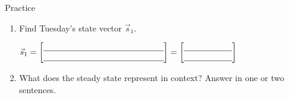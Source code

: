 \documentclass[10pt]{article}
\begin{document}
\begin{notesbox}{Practice}
\begin{enumerate}[leftmargin=1.5em, itemsep=10pt]
\begin{enumerate}[label=(\alph*), leftmargin=1.5em, itemsep=6pt]
        \item Find Tuesday's state vector $\vec{s}_1$.

        \vspace{4pt}
        $\vec{s}_1 = \begin{bmatrix}\blank{5cm}\\\blank{5cm}\end{bmatrix} = \begin{bmatrix}\blank{2cm}\\\blank{2cm}\end{bmatrix}$

        \item What does the steady state represent in context? Answer in one or two sentences.

        \writeline
        \writeline
    \end{enumerate}

\end{enumerate}
\end{notesbox}
\end{document}
